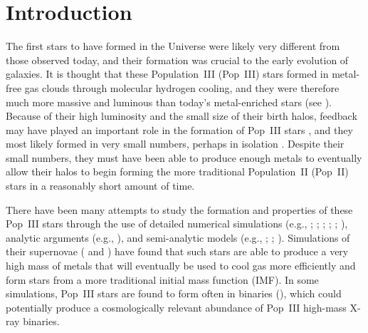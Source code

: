 \documentclass[a4paper,fleqn,usenatbib]{mnras}
\begin{document}

\section{Introduction}

The first stars to have formed in the Universe were likely very different from those observed today, and their formation 
was crucial to the early evolution of galaxies. It is thought that these Population~III (Pop~III) stars formed in metal-free gas clouds through molecular hydrogen cooling, and they were therefore much more massive \citep[][]{bromm_1999, abel_2002} and luminous than today's metal-enriched stars (see \citealt{bromm_2013}). Because of their high luminosity and the small size of their birth halos, feedback may have played an important role in the formation of Pop~III stars \citep[][]{machacek_2001, wise_abel_2007, oshea_norman_2008, shapiro_2004}, and they most likely formed in very small numbers, perhaps in isolation \citep[][]{visbal_2017}. Despite their small numbers, they must have been able to produce enough metals to eventually allow their halos to begin forming the more traditional Population~II (Pop~II) stars in a reasonably short amount of time.

There have been many attempts to study the formation and properties of these Pop~III stars through the use of detailed numerical simulations (e.g., \citealt{machacek_2001}; \citealt{wise_abel_2007}; \citealt{oshea_norman_2008}; \citealt{xu_2016}; \citealt{stacy_2012}; \citealt{hirano_2015}), analytic arguments (e.g., \citealt{mckee_2008}), and semi-analytic models (e.g., \citealt{trenti_2009}; \citealt{jaacks_2017}; \citealt{visbal_2017}). Simulations of their supernovae (\citealt{heger_2002} and \citealt{heger_2010}) have found that such stars are able to produce a very high mass of metals that will eventually be used to cool gas more efficiently and form stars from a more traditional initial mass function (IMF). In some simulations, Pop~III stars are found 
to form often in binaries (\citealt{turk_2009}), which could potentially  
produce a cosmologically relevant abundance of Pop~III high-mass X-ray binaries.
\end{document}
